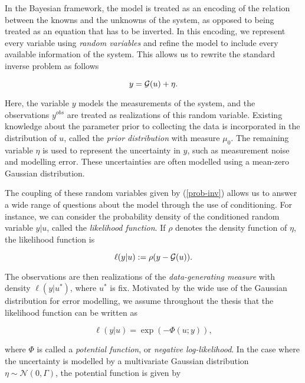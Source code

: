 In the Bayesian framework, the model is treated as an encoding of the relation between the knowns and the unknowns of the system, as opposed to being treated as an equation that has to be inverted. In this encoding, we represent every variable using \textit{random variables} and refine the model to include every available information of the system. This allows us to rewrite the standard inverse problem as follows

\begin{equation}\label{prob-inv}
  y = \mathcal{G}(u) + \eta.
\end{equation}

Here, the variable $y$ models the measurements of the system, and the observations $y^{obs}$ are treated as realizations of this random variable. Existing knowledge about the parameter prior to collecting the data is incorporated in the distribution of $u$, called the \textit{prior distribution} with measure $\mu_0$. The remaining variable $\eta$ is used to represent the uncertainty in $y$, such as measurement noise and modelling error. These uncertainties are often modelled using a mean-zero Gaussian distribution.

The coupling of these random variables given by (\ref{prob-inv}) allows us to answer a wide range of questions about the model through the use of conditioning. For instance, we can consider the probability density of the conditioned random variable $y|u$, called the \textit{likelihood function}. If $\rho$ denotes the density function of $\eta$, the likelihood function is

\begin{equation}\label{def-ell}
  \ell(y|u) := \rho(y - \mathcal{G}(u)).
\end{equation}

The observations are then realizations of the \textit{data-generating measure} with density $\ell(y|u^*)$, where $u^*$ is fix. Motivated by the wide use of the Gaussian distribution for error modelling, we assume throughout the thesis that the likelihood function can be written as

\begin{equation} \label{exponential-ell}
  \ell(y|u) = \exp(-\Phi(u;y)),
\end{equation}

where $\Phi$ is called a \textit{potential function}, or \textit{negative log-likelihood}. In the case where the uncertainty is modelled by a multivariate Gaussian distribution $\eta \sim \mathcal{N}(0, \Gamma)$, the potential function is given by

